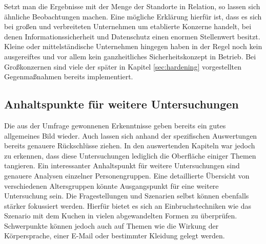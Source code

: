 Setzt man die Ergebnisse mit der Menge der Standorte in Relation, so lassen sich ähnliche Beobachtungen machen.
Eine mögliche Erklärung hierfür ist, dass es sich bei großen und verbreiteten Unternehmen um etablierte Konzerne handelt, bei denen Informationssicherheit und Datenschutz einen enormen Stellenwert besitzt.
Kleine oder mittelständische Unternehmen hingegen haben in der Regel noch kein ausgereiftes und vor allem kein ganzheitliches Sicherheitskonzept in Betrieb.
Bei Großkonzernen sind viele der später in Kapitel \ref{sec:hardening} vorgestellten Gegenmaßnahmen bereits implementiert.


\subsection{Anhaltspunkte für weitere Untersuchungen}\label{sec:anhaltspunkte-fuer-weitere-untersuchungen}

Die aus der Umfrage gewonnenen Erkenntnisse geben bereits ein gutes allgemeines Bild wieder.
Auch lassen sich anhand der spezifischen Auswertungen bereits genauere Rückschlüsse ziehen.
In den auswertenden Kapiteln war jedoch zu erkennen, dass diese Untersuchungen lediglich die Oberfläche einiger Themen tangieren.
Ein interessanter Anhaltspunkt für weitere Untersuchungen sind genauere Analysen einzelner Personengruppen.
Eine detaillierte Übersicht von verschiedenen Altersgruppen könnte Ausgangspunkt für eine weitere Untersuchung sein.
Die Fragestellungen und Szenarien selbst können ebenfalls stärker fokussiert werden.
Hierfür bietet es sich an Einbruchstechniken wie das Szenario mit dem Kuchen in vielen abgewandelten Formen zu überprüfen.
Schwerpunkte können jedoch auch auf Themen wie die Wirkung der Körpersprache, einer E-Mail oder bestimmter Kleidung gelegt werden.

